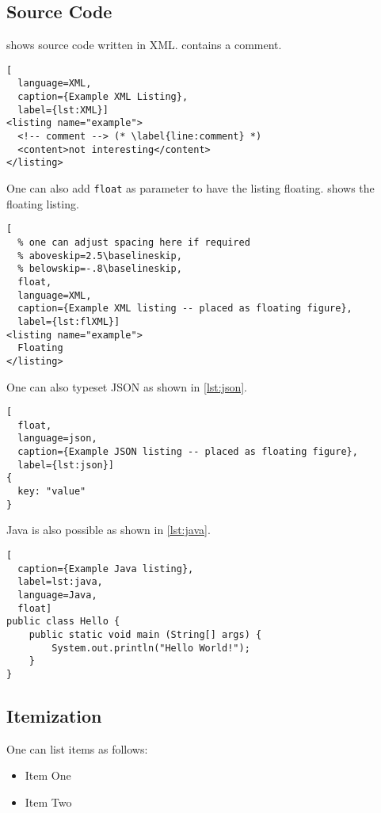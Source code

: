 \documentclass[peerreview,a4paper,english]{IEEEtran}[2015/08/26]
\begin{document}
\subsection{Source Code}
\begin{ltgexample}
 shows source code written in XML.
 contains a comment.
\begin{lstlisting}[
  language=XML,
  caption={Example XML Listing},
  label={lst:XML}]
<listing name="example">
  <!-- comment --> (* \label{line:comment} *)
  <content>not interesting</content>
</listing>
\end{lstlisting}
\end{ltgexample}
One can also add \verb+float+ as parameter to have the listing floating.
 shows the floating listing.
\begin{ltgexample}
\begin{lstlisting}[
  % one can adjust spacing here if required
  % aboveskip=2.5\baselineskip,
  % belowskip=-.8\baselineskip,
  float,
  language=XML,
  caption={Example XML listing -- placed as floating figure},
  label={lst:flXML}]
<listing name="example">
  Floating
</listing>
\end{lstlisting}
\end{ltgexample}
One can also typeset JSON as shown in \cref{lst:json}.
\begin{ltgexample}
\begin{lstlisting}[
  float,
  language=json,
  caption={Example JSON listing -- placed as floating figure},
  label={lst:json}]
{
  key: "value"
}
\end{lstlisting}
\end{ltgexample}
Java is also possible as shown in \cref{lst:java}.
\begin{ltgexample}
\begin{lstlisting}[
  caption={Example Java listing},
  label=lst:java,
  language=Java,
  float]
public class Hello {
    public static void main (String[] args) {
        System.out.println("Hello World!");
    }
}
\end{lstlisting}
\end{ltgexample}
\subsection{Itemization}
One can list items as follows:
\begin{ltgexample}
\begin{itemize}
\item Item One
\item Item Two
\end{itemize}
\end{ltgexample}
\end{document}
